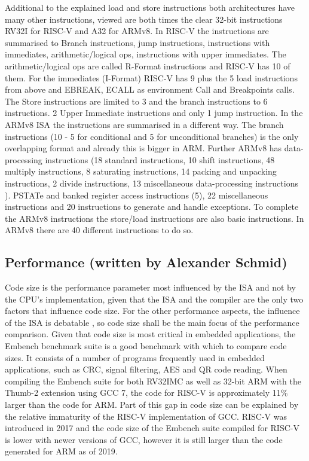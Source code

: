 \documentclass[conference]{IEEEtran}
\begin{document}
	Additional to the explained load and store instructions both architectures have many other instructions, viewed are both times the clear 32-bit instructions RV32I for RISC-V and A32 for ARMv8.
	In RISC-V the instructions are summarised to Branch instructions, jump instructions, instructions with immediates, arithmetic/logical ops, instructions with upper immediates.
	The arithmetic/logical ops are called R-Format instructions and RISC-V has 10 of them.  For the immediates (I-Format) RISC-V has 9 plus the 5 load instructions from above and EBREAK, ECALL as  environment Call and Breakpoints calls. The Store instructions are limited to 3 and the branch instructions to 6 instructions. 2 Upper Immediate instructions and only 1 jump instruction.\cite{Waterman2017}
	In the ARMv8 \gls{ISA} the instructions are summarised in a different way. 
	The branch instructions (10 -  5 for conditional and 5 for unconditional branches) is the only overlapping format and already this is bigger in ARM. Further ARMv8 has data-processing instructions (18 standard instructions, 10 shift instructions, 48 multiply instructions, 8 saturating instructions, 14 packing and unpacking instructions, 2 divide instructions, 13 miscellaneous data-processing instructions ). PSTATe and banked register access instructions (5), 22 miscellaneous instructions and 20 instructions to generate and handle exceptions. To complete the ARMv8 instructions the store/load instructions are also basic instructions. In ARMv8 there are 40 different instructions to do so. \cite{Arm2020}

	
	\subsection{Performance (written by Alexander Schmid)}
	Code size is the performance parameter most influenced by the \gls{ISA} and not by the \gls{CPU}'s implementation,
	given that the \gls{ISA} and the compiler are the only two factors that influence code size.
	For the other performance aspects, the influence of the \gls{ISA} is debatable \cite{Blem2013} \cite{Akram2017},
	so code size shall be the main focus of the performance comparison.
	Given that code size is most critical in embedded applications, the Embench benchmark suite is a good benchmark
	with which to compare code sizes. It consists of a number of programs frequently used in embedded
	applications, such as CRC, signal filtering, AES and QR code reading. \cite{Patterson2019}
	When compiling the Embench suite for both RV32IMC as well as 32-bit ARM with the Thumb-2 extension using GCC 7,
	the code for RISC-V is approximately 11\% larger than the code for ARM. \cite{Perotti2020}
	Part of this gap in code size can be explained by the relative immaturity of the RISC-V implementation of
	GCC. RISC-V was introduced in 2017 and the code size of the Embench suite
	compiled for RISC-V is lower with newer versions of GCC, however it is still larger than the code generated for ARM as of 2019. \cite{Patterson2019}
\end{document}
